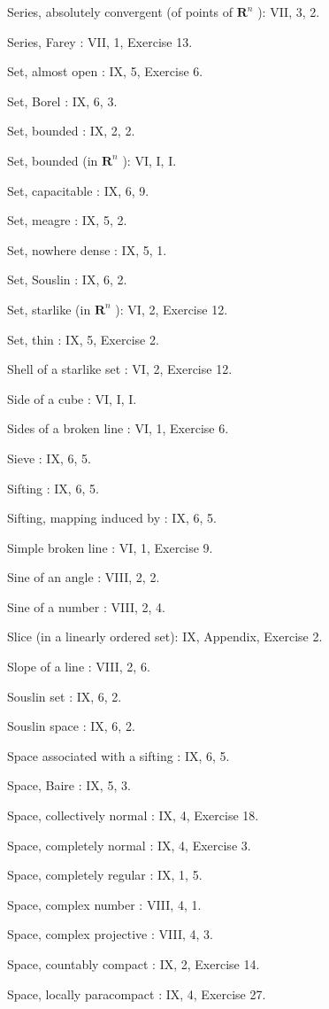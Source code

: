 Series, absolutely convergent (of points of \(\mathbf{R}^n\) ): VII, 3, 2.

Series, Farey : VII, 1, Exercise 13.

Set, almost open : IX, 5, Exercise 6.

Set, Borel : IX, 6, 3.

Set, bounded : IX, 2, 2.

Set, bounded (in \(\mathbf{R}^n\) ): VI, I, I.

Set, capacitable : IX, 6, 9.

Set, meagre : IX, 5, 2.

Set, nowhere dense : IX, 5, 1.

Set, Souslin : IX, 6, 2.

Set, starlike (in \(\mathbf{R}^n\) ): VI, 2, Exercise 12.

Set, thin : IX, 5, Exercise 2.

Shell of a starlike set : VI, 2, Exercise 12.

Side of a cube : VI, I, I.

Sides of a broken line : VI, 1, Exercise 6.

Sieve : IX, 6, 5.

Sifting : IX, 6, 5.

Sifting, mapping induced by : IX, 6, 5.

Simple broken line : VI, 1, Exercise 9.

Sine of an angle : VIII, 2, 2.

Sine of a number : VIII, 2, 4.

Slice (in a linearly ordered set): IX, Appendix, Exercise 2.

Slope of a line : VIII, 2, 6.

Souslin set : IX, 6, 2.

Souslin space : IX, 6, 2.

Space associated with a sifting : IX, 6, 5.

Space, Baire : IX, 5, 3.

Space, collectively normal : IX, 4, Exercise 18.

Space, completely normal : IX, 4, Exercise 3.

Space, completely regular : IX, 1, 5.

Space, complex number : VIII, 4, 1.

Space, complex projective : VIII, 4, 3.

Space, countably compact : IX, 2, Exercise 14.

Space, locally paracompact : IX, 4, Exercise 27.

